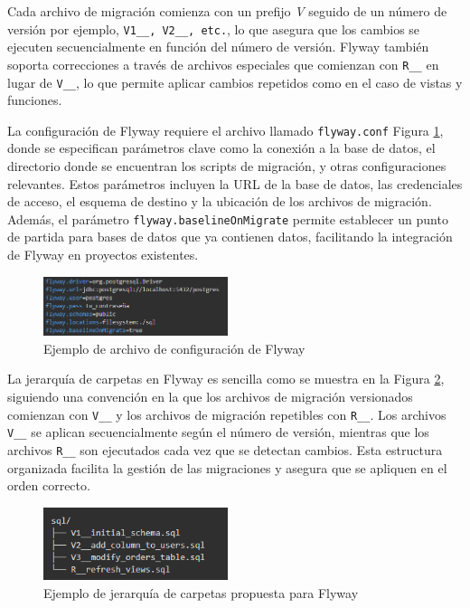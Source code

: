 \documentclass{IEEEtran}
\begin{document}
Cada archivo de migración comienza con un prefijo \textit{V} seguido de un número de versión por ejemplo, \texttt{V1\_\_, V2\_\_, etc.}, lo que asegura que los cambios se ejecuten secuencialmente en función del número de versión. Flyway también soporta correcciones a través de archivos especiales que comienzan con \texttt{R\_\_} en lugar de \texttt{V\_\_}, lo que permite aplicar cambios repetidos como en el caso de vistas y funciones.

La configuración de Flyway requiere el archivo llamado \texttt{flyway.conf} Figura \ref{fig:flywayPropertiesExample}, donde se especifican parámetros clave como la conexión a la base de datos, el directorio donde se encuentran los scripts de migración, y otras configuraciones relevantes. Estos parámetros incluyen la URL de la base de datos, las credenciales de acceso, el esquema de destino y la ubicación de los archivos de migración. Además, el parámetro \texttt{flyway.baselineOnMigrate} permite establecer un punto de partida para bases de datos que ya contienen datos, facilitando la integración de Flyway en proyectos existentes.

\begin{figure}[H]
    \centering
    \includegraphics[width=0.48\textwidth]{images/flywayPropertiesExample.png}
    \caption{Ejemplo de archivo de configuración de Flyway}
    \label{fig:flywayPropertiesExample}
\end{figure}

La jerarquía de carpetas en Flyway es sencilla como se muestra en la Figura \ref{fig:folderHerarchyFlyway}, siguiendo una convención en la que los archivos de migración versionados comienzan con \texttt{V\_\_} y los archivos de migración repetibles con \texttt{R\_\_}. Los archivos \texttt{V\_\_} se aplican secuencialmente según el número de versión, mientras que los archivos \texttt{R\_\_} son ejecutados cada vez que se detectan cambios. Esta estructura organizada facilita la gestión de las migraciones y asegura que se apliquen en el orden correcto.

\begin{figure}[H]
    \centering
    \includegraphics[width=0.48\textwidth]{images/folderHerarchyFlyway.png}
    \caption{Ejemplo de jerarquía de carpetas propuesta para Flyway}
    \label{fig:folderHerarchyFlyway}
\end{figure}
\end{document}
